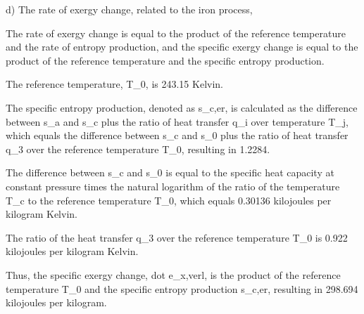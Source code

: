 d) The rate of exergy change, related to the iron process,

The rate of exergy change is equal to the product of the reference temperature and the rate of entropy production, and the specific exergy change is equal to the product of the reference temperature and the specific entropy production.

The reference temperature, T_0, is 243.15 Kelvin.

The specific entropy production, denoted as s_c,er, is calculated as the difference between s_a and s_c plus the ratio of heat transfer q_i over temperature T_j, which equals the difference between s_c and s_0 plus the ratio of heat transfer q_3 over the reference temperature T_0, resulting in 1.2284.

The difference between s_c and s_0 is equal to the specific heat capacity at constant pressure times the natural logarithm of the ratio of the temperature T_c to the reference temperature T_0, which equals 0.30136 kilojoules per kilogram Kelvin.

The ratio of the heat transfer q_3 over the reference temperature T_0 is 0.922 kilojoules per kilogram Kelvin.

Thus, the specific exergy change, dot e_x,verl, is the product of the reference temperature T_0 and the specific entropy production s_c,er, resulting in 298.694 kilojoules per kilogram.